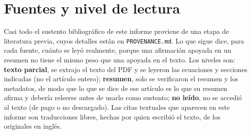 \section{Fuentes y nivel de lectura}
\label{ap:fuentes}

Casi todo el sustento bibliográfico de este informe proviene de una etapa de literatura previa, cuyos detalles están en \texttt{PROVENANCE.md}. Lo que sigue dice, para cada fuente, cuánto se leyó realmente, porque una afirmación apoyada en un resumen no tiene el mismo peso que una apoyada en el texto. Los niveles son: \textbf{texto parcial}, se extrajo el texto del PDF y se leyeron las ecuaciones y secciones indicadas (no el artículo entero); \textbf{resumen}, solo se verificaron el resumen y los metadatos, de modo que lo que se dice de ese artículo es lo que su resumen afirma y debería releerse antes de usarlo como sustento; \textbf{no leído}, no se accedió al texto (de pago o no descargado). Las citas textuales que aparecen en este informe son traducciones libres, hechas por quien escribió el texto, de los originales en inglés.

